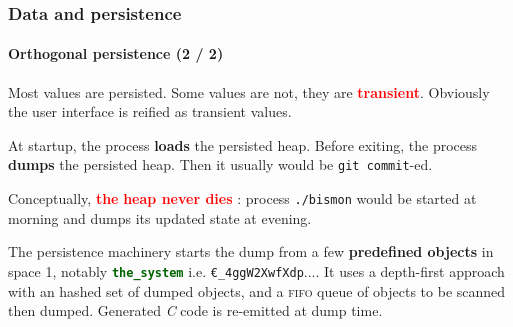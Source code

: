 \documentclass[xcolor=svgnames,final,smaller,a4]{beamer}
\begin{document}
\begin{frame}
    \frametitle{Data and persistence}
    \framesubtitle{Orthogonal persistence (2 / 2)}


Most values are persisted. Some values are not, they are
\textcolor{red}{\textbf{transient}}. Obviously the user interface is
reified as transient values.

At startup, the {\Bismon} process \textbf{loads} the persisted heap.
Before exiting, the {\Bismon} process \textbf{dumps} the persisted
heap. Then it usually would be \texttt{git commit}-ed.

Conceptually, \textcolor{red}{\textbf{the}} {\Bismon}  \textcolor{red}{\textbf{heap never dies}} : process {\texttt{./bismon}} would be started at morning and dumps its updated state at evening.

The persistence machinery starts the dump from a few \textbf{predefined
  objects} in space 1, notably
{\textcolor{DarkGreen}{\texttt{\textbf{the\_system}}}}
i.e. \texttt{€\_4ggW2XwfXdp}.... It uses a depth-first approach with
an hashed set of dumped objects, and a \textsc{fifo} queue of objects
to be scanned then dumped. Generated \textit{C} code is re-emitted at dump time.

\end{frame}
    
\end{document}
